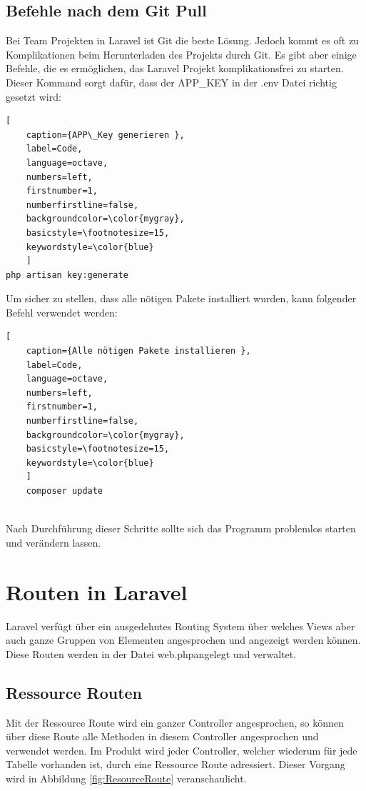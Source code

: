 \subsection{Befehle nach dem Git Pull} \label{sec: Git}
Bei Team Projekten in Laravel ist Git die beste Lösung. Jedoch kommt es oft zu Komplikationen beim Herunterladen des Projekts durch Git. Es gibt aber einige Befehle, die es ermöglichen, das Laravel Projekt komplikationsfrei zu starten.
Dieser Kommand sorgt dafür, dass der APP\_KEY in der .env Datei richtig gesetzt wird:
\begin{lstlisting}[
	caption={APP\_Key generieren },
	label=Code,
	language=octave,
	numbers=left,
	firstnumber=1,
	numberfirstline=false,
	backgroundcolor=\color{mygray},
	basicstyle=\footnotesize=15,
	keywordstyle=\color{blue}
	]
php artisan key:generate 

\end{lstlisting}
Um sicher zu stellen, dass alle nötigen Pakete installiert wurden, kann folgender Befehl verwendet werden:
\begin{lstlisting}[
	caption={Alle nötigen Pakete installieren },
	label=Code,
	language=octave,
	numbers=left,
	firstnumber=1,
	numberfirstline=false,
	backgroundcolor=\color{mygray},
	basicstyle=\footnotesize=15,
	keywordstyle=\color{blue}
	]
	composer update
	
\end{lstlisting}
Nach Durchführung dieser Schritte sollte sich das Programm problemlos starten und verändern lassen.


\newpage
\section{Routen in Laravel}
Laravel verfügt über ein ausgedehntes Routing System über welches Views aber auch ganze Gruppen von Elementen angesprochen und angezeigt werden können. Diese Routen werden in der Datei \glqq web.php\grqq \space angelegt und verwaltet.
\subsection{Ressource Routen} 
Mit der Ressource Route wird ein ganzer Controller angesprochen, so können über diese Route alle Methoden in diesem Controller angesprochen und verwendet werden. Im Produkt wird jeder Controller, welcher wiederum für jede Tabelle vorhanden ist, durch eine Ressource Route adressiert. Dieser Vorgang wird in Abbildung \ref{fig:ResourceRoute} veranschaulicht.

